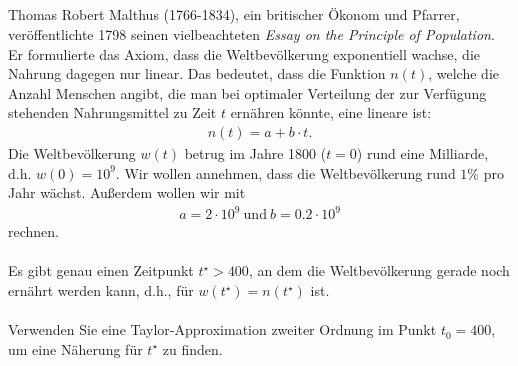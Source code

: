 \subsection*{}
Thomas Robert Malthus (1766-1834), ein britischer Ökonom und Pfarrer, veröffentlichte
1798 seinen vielbeachteten \textit{Essay on the Principle of Population}.
Er formulierte das Axiom, dass die Weltbevölkerung exponentiell wachse, die Nahrung dagegen nur linear. 
Das bedeutet, dass die Funktion $ n(t) $, welche die Anzahl Menschen angibt, die man bei optimaler Verteilung der zur Verfügung stehenden Nahrungsmittel zu Zeit $ t $ ernähren könnte, eine lineare ist:
\begin{align*}
	n(t) = a + b \cdot t.
\end{align*}
Die Weltbevölkerung $ w(t) $ betrug im Jahre 1800 ($ t= 0 $) rund eine Milliarde, d.h. $ w(0) = 10^9 $.
Wir wollen annehmen, dass die Weltbevölkerung rund $ 1\% $ pro Jahr wächst.
Außerdem wollen wir mit
\begin{align*}
	a = 2 \cdot 10^9 \ \textrm{und} \ b = 0.2 \cdot 10^9
\end{align*}
rechnen.\\
\\
Es gibt genau einen Zeitpunkt $ t^\star > 400 $, an dem die Weltbevölkerung gerade noch ernährt werden kann, d.h., für $ w(t^\star)  = n(t^\star )$ ist.\\
\\
Verwenden Sie eine Taylor-Approximation zweiter Ordnung im Punkt $ t_0 = 400 $, um eine Näherung für $ t^\star $ zu finden.
 \\
\\
\titleformat{\subsection}[display]
{\normalfont\large\bfseries}{\thesubsection}{1mm}{}
